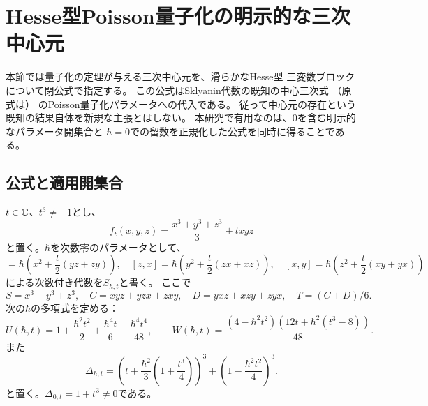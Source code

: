 \section{Hesse型Poisson量子化の明示的な三次中心元}
\label{sec:explicit-hesse-center}
本節では量子化の定理が与える三次中心元を、滑らかなHesse型
三変数ブロックについて閉公式で指定する。
この公式はSklyanin代数の既知の中心三次式
\cite[Theorem 1およびSection 2]{DeLaetLeBruyn}
（原式は\cite[p.~35, Remark (1)]{SmithTate}）
のPoisson量子化パラメータへの代入である。
従って中心元の存在という既知の結果自体を新規な主張とはしない。
本研究で有用なのは、$0$を含む明示的なパラメータ開集合と
$\hbar=0$での留数を正規化した公式を同時に得ることである。

\subsection{公式と適用開集合}
$t\in\mathbb C$、$t^3\ne-1$とし、
\begin{equation}
 f_t(x,y,z)=\frac{x^3+y^3+z^3}{3}+txyz
\end{equation}
と置く。$\hbar$を次数零のパラメータとして、
\begin{equation}
 [y,z]=\hbar\left(x^2+\frac{t}{2}(yz+zy)\right),
 \quad
 [z,x]=\hbar\left(y^2+\frac{t}{2}(zx+xz)\right),
 \quad
 [x,y]=\hbar\left(z^2+\frac{t}{2}(xy+yx)\right)
 \label{eq:hesse-commutators}
\end{equation}
による次数付き代数を$S_{\hbar,t}$と書く。
ここで
\begin{equation}
 S=x^3+y^3+z^3,\quad
 C=xyz+yzx+zxy,\quad
 D=yxz+xzy+zyx,\quad T=(C+D)/6.
\end{equation}
次の$\hbar$の多項式を定める：
\begin{equation}
 U(\hbar,t)=1+\frac{\hbar^2t^2}{2}
  +\frac{\hbar^4t}{6}-\frac{\hbar^4t^4}{48},
 \qquad
 W(\hbar,t)=
 \frac{(4-\hbar^2t^2)
 (12t+\hbar^2(t^3-8))}{48}.
 \label{eq:hesse-UW}
\end{equation}
また
\begin{equation}
 \Delta_{\hbar,t}=
 \left(t+\frac{\hbar^2}{3}
       \left(1+\frac{t^3}{4}\right)\right)^3
  +\left(1-\frac{\hbar^2t^2}{4}\right)^3.
 \label{eq:hesse-discriminant}
\end{equation}
と置く。$\Delta_{0,t}=1+t^3\ne0$である。

